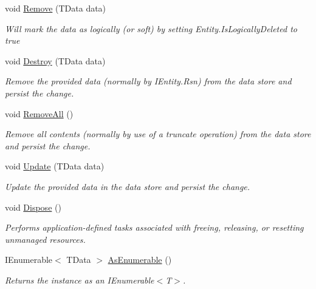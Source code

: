 \begin{DoxyCompactItemize}
void \hyperlink{classCqrs_1_1Azure_1_1DocumentDb_1_1DataStores_1_1AzureDocumentDbDataStore_abf9bcf75e8e0e1ec86155bf4da1a7b7a_abf9bcf75e8e0e1ec86155bf4da1a7b7a}{Remove} (T\+Data data)
\begin{DoxyCompactList}\small\item\em Will mark the {\itshape data}  as logically (or soft) by setting Entity.\+Is\+Logically\+Deleted to true \end{DoxyCompactList}\item 
void \hyperlink{classCqrs_1_1Azure_1_1DocumentDb_1_1DataStores_1_1AzureDocumentDbDataStore_affe39fe57e590555256258fa6c568c29_affe39fe57e590555256258fa6c568c29}{Destroy} (T\+Data data)
\begin{DoxyCompactList}\small\item\em Remove the provided {\itshape data}  (normally by I\+Entity.\+Rsn) from the data store and persist the change. \end{DoxyCompactList}\item 
void \hyperlink{classCqrs_1_1Azure_1_1DocumentDb_1_1DataStores_1_1AzureDocumentDbDataStore_a0d72cc318e98e01b3dbed86d412a8778_a0d72cc318e98e01b3dbed86d412a8778}{Remove\+All} ()
\begin{DoxyCompactList}\small\item\em Remove all contents (normally by use of a truncate operation) from the data store and persist the change. \end{DoxyCompactList}\item 
void \hyperlink{classCqrs_1_1Azure_1_1DocumentDb_1_1DataStores_1_1AzureDocumentDbDataStore_a55f504ed5094e3041a266b958424b1a2_a55f504ed5094e3041a266b958424b1a2}{Update} (T\+Data data)
\begin{DoxyCompactList}\small\item\em Update the provided {\itshape data}  in the data store and persist the change. \end{DoxyCompactList}\item 
void \hyperlink{classCqrs_1_1Azure_1_1DocumentDb_1_1DataStores_1_1AzureDocumentDbDataStore_ade945ac02451a490711367dbe54d4132_ade945ac02451a490711367dbe54d4132}{Dispose} ()
\begin{DoxyCompactList}\small\item\em Performs application-\/defined tasks associated with freeing, releasing, or resetting unmanaged resources. \end{DoxyCompactList}\item 
I\+Enumerable$<$ T\+Data $>$ \hyperlink{classCqrs_1_1Azure_1_1DocumentDb_1_1DataStores_1_1AzureDocumentDbDataStore_acbe24a7d0def44ca4826bbf5658a6054_acbe24a7d0def44ca4826bbf5658a6054}{As\+Enumerable} ()
\begin{DoxyCompactList}\small\item\em Returns the instance as an I\+Enumerable$<$\+T$>$. \end{DoxyCompactList}\end{DoxyCompactItemize}
